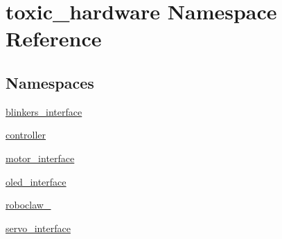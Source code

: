\hypertarget{namespacetoxic__hardware}{}\section{toxic\+\_\+hardware Namespace Reference}
\label{namespacetoxic__hardware}
\subsection*{Namespaces}
\begin{DoxyCompactItemize}
\item 
 \mbox{\hyperlink{namespacetoxic__hardware_1_1blinkers__interface}{blinkers\+\_\+interface}}
\item 
 \mbox{\hyperlink{namespacetoxic__hardware_1_1controller}{controller}}
\item 
 \mbox{\hyperlink{namespacetoxic__hardware_1_1motor__interface}{motor\+\_\+interface}}
\item 
 \mbox{\hyperlink{namespacetoxic__hardware_1_1oled__interface}{oled\+\_\+interface}}
\item 
 \mbox{\hyperlink{namespacetoxic__hardware_1_1roboclaw__3}{roboclaw\+\_}}
\item 
 \mbox{\hyperlink{namespacetoxic__hardware_1_1servo__interface}{servo\+\_\+interface}}
\end{DoxyCompactItemize}
